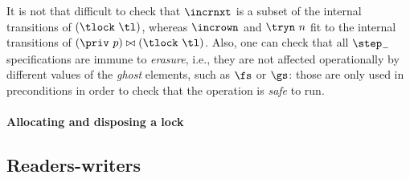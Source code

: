 It is not that difficult to check that $\incrnxt$ is a subset of the
internal transitions of $(\tlock~\tl)$, whereas $\incrown$ and
$\tryn~n$ fit to the internal transitions of $(\priv~p) \bowtie
(\tlock~\tl)$. Also, one can check that all $\step_{-}$
specifications are immune to \emph{erasure}, i.e., they are not
affected operationally by different values of the \emph{ghost}
elements, such as $\fs$ or $\gs$: those are only used in preconditions
in order to check that the operation is \emph{safe} to run.

\paragraph{Allocating and disposing a lock}
\label{sec:alloc-disp-lock}


\subsection{Readers-writers}
\label{sec:readers-writers}



